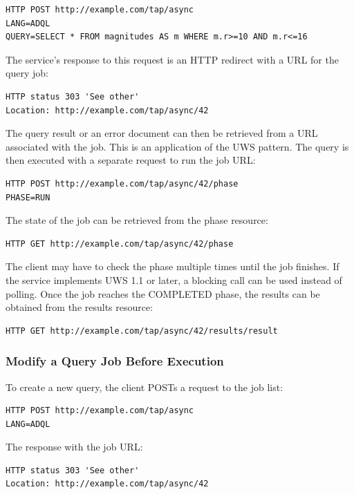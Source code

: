 \documentclass[11pt,letter]{ivoa}
\begin{document}
\begin{verbatim}
HTTP POST http://example.com/tap/async
LANG=ADQL
QUERY=SELECT * FROM magnitudes AS m WHERE m.r>=10 AND m.r<=16
\end{verbatim}

The service's response to this request is an HTTP redirect with a URL for the 
query job:

\begin{verbatim}
HTTP status 303 'See other'
Location: http://example.com/tap/async/42
\end{verbatim}

The query result or an error document can then be retrieved from a URL 
associated with the job. This is an application of the UWS pattern. The query is 
then executed with a separate request to run the job URL:

\begin{verbatim}
HTTP POST http://example.com/tap/async/42/phase
PHASE=RUN
\end{verbatim}

The state of the job can be retrieved from the phase resource:

\begin{verbatim}
HTTP GET http://example.com/tap/async/42/phase
\end{verbatim}

The client may have to check the phase multiple times until the job 
finishes. If the service implements UWS 1.1 \citep{2016ivoa.spec.1024H} or later, a blocking call
can be used instead of polling. Once the job reaches the COMPLETED phase, 
the results can be obtained from the results resource:

\begin{verbatim}
HTTP GET http://example.com/tap/async/42/results/result
\end{verbatim}

\subsubsection{Modify a Query Job Before Execution}
To create a new query, the client POSTs a request to the job list:

\begin{verbatim}
HTTP POST http://example.com/tap/async
LANG=ADQL
\end{verbatim}

The response with the job URL:

\begin{verbatim}
HTTP status 303 'See other'
Location: http://example.com/tap/async/42
\end{verbatim}
\end{document}
